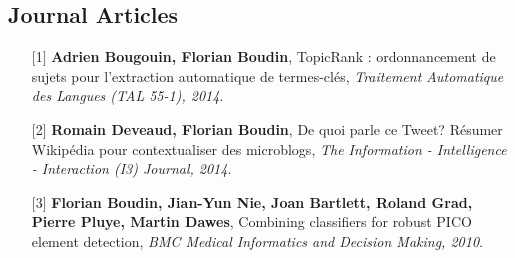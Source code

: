 \documentclass[11pt,a4paper]{moderncv}
\begin{document}
\setlength{\hintscolumnwidth}{0cm}

    \subsection{Journal Articles}
    \begin{itemize}[leftmargin=1.2cm,itemsep=0.1cm]
        \item[{\small$[$1$]$}] \textbf{Adrien Bougouin, Florian Boudin}, TopicRank : ordonnancement de sujets pour l'extraction automatique de termes-clés, \textit{Traitement Automatique des Langues (TAL 55-1), 2014}.
        \item[{\small$[$2$]$}] \textbf{Romain Deveaud, Florian Boudin}, De quoi parle ce Tweet? Résumer Wikipédia pour contextualiser des microblogs, \textit{The Information - Intelligence - Interaction (I3) Journal, 2014}.
        \item[{\small$[$3$]$}] \textbf{Florian Boudin, Jian-Yun Nie, Joan Bartlett, Roland Grad, Pierre Pluye, Martin Dawes}, Combining classifiers for robust PICO element detection, \textit{BMC Medical Informatics and Decision Making, 2010}.
    \end{itemize}
\end{document}
